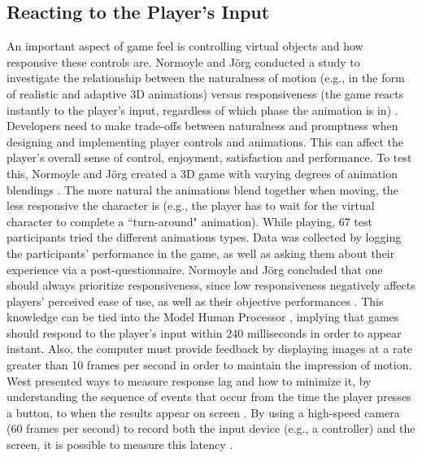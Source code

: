 \subsection{Reacting to the Player's Input}
An important aspect of game feel is controlling virtual objects and how responsive these controls are. Normoyle and J\"{o}rg conducted a study to investigate the relationship between the naturalness of motion (e.g., in the form of realistic and adaptive 3D animations) versus responsiveness (the game reacts instantly to the player's input, regardless of which phase the animation is in) \cite{normoyle_trade-offs_2014}. Developers need to make trade-offs between naturalness and promptness when designing and implementing player controls and animations. This can affect the player's overall sense of control, enjoyment, satisfaction and performance. To test this, Normoyle and J\"{o}rg  created a 3D game with varying degrees of animation blendings \cite{normoyle_trade-offs_2014}. The more natural the animations blend together when moving, the less responsive the character is (e.g., the player has to wait for the virtual character to complete a ``turn-around" animation). While playing, 67 test participants tried the different animations types.  Data was collected by logging the participants' performance in the game, as well as asking them about their experience via a post-questionnaire. Normoyle and J\"{o}rg concluded that one should always prioritize responsiveness, since low responsiveness negatively affects players' perceived ease of use, as well as their objective performances \cite{normoyle_trade-offs_2014}. This knowledge can be tied into the Model Human Processor \cite{card1986model}, implying that games should respond to the player's input within 240 milliseconds in order to appear instant. Also, the computer must provide feedback by displaying images at a rate greater than 10 frames per second in order to maintain the impression of motion. West presented ways to measure response lag and how to minimize it, by understanding the sequence of events that occur from the time the player presses a button, to when the results appear on screen \cite{measure_lag, program_lag}. By using a high-speed camera (60 frames per second) to record both the input device (e.g., a controller) and the screen, it is possible to measure this latency \cite{euro}.

